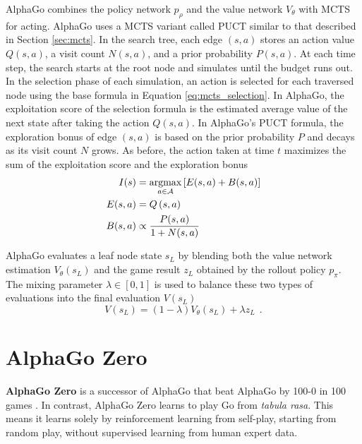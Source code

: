 AlphaGo combines the policy network $p_{\rho}$ and the value network $V_{\theta}$ with MCTS for acting.
AlphaGo uses a MCTS variant called PUCT similar to that described in Section \ref{sec:mcts}.
In the search tree, each edge $(s, a)$ stores an action value $Q(s, a)$, a visit count $N(s, a)$, and a prior probability $P(s, a)$.
At each time step, the search starts at the root node and simulates until the budget runs out.
In the selection phase of each simulation, an action is selected for each traversed node using the base formula in Equation \ref{eq:mcts_selection}.
In AlphaGo, the exploitation score of the selection formula is the estimated average value of the next state after taking the action $Q(s, a)$.
In AlphaGo's PUCT formula, the exploration bonus of edge $(s, a)$ is based on the prior probability $P$ and decays as its visit count $N$ grows.
As before, the action taken at time $t$ maximizes the sum of the exploitation score and the exploration bonus
\begin{align*}
    I(s)     & = \operatorname*{argmax}_{a \in \mathcal{A}}\left[ E(s, a)+B(s, a) \right]  \\
    E(s, a)  & = Q\left(s, a\right)  \\
    B(s, a)  & \propto \frac{P(s, a)}{1 + N(s, a)}  \\
\end{align*}

AlphaGo evaluates a leaf node state $s_L$ by blending both the value network estimation $V_\theta(s_L)$ and the game result $z_L$ obtained by the rollout policy $p_\pi$.
The mixing parameter $\lambda \in [0, 1]$ is used to balance these two types of evaluations into the final evaluation $V(s_L)$
$$
    V\left(s_{L}\right) = (1-\lambda) V_{\theta}\left(s_{L}\right)+\lambda z_{L} ~~ .
$$

\section{AlphaGo Zero}
\textbf{AlphaGo Zero} is a successor of AlphaGo that beat AlphaGo by 100-0 in 100 games \cite{MasteringGameGo_Silver.Schrittwieser.ea_2017}.
In contrast, AlphaGo Zero learns to play Go from \textit{tabula rasa}.
This means it learns solely by reinforcement learning from self-play, starting from random play, without supervised learning from human expert data.

